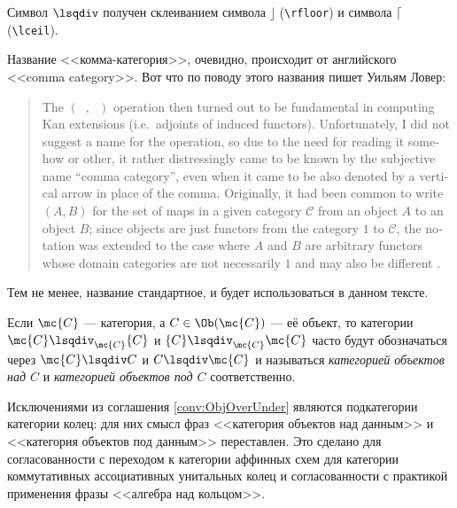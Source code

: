 \documentclass[
	extrafontsizes,
	11pt,
	hyphens,
]{memoir}
\begin{document}
\begin{remark}
Символ \(\lsqdiv\) получен склеиванием символа \(\rfloor\) (\texttt{\textbackslash{}rfloor}) и символа \(\lceil\) (\texttt{\textbackslash{}lceil}).
\end{remark}

\begin{remark}
Название <<комма-категория>>, очевидно, происходит от английского <<\textenglish{comma category}>>.
Вот что по поводу этого названия пишет Уильям Ловер:
\begin{quote}
\textenglish{%
The \((\phantom{x}, \phantom{x})\) operation then turned out to be fundamental in computing Kan extensions (i.e.\ adjoints of induced functors). Unfortunately, I did not suggest a name for the operation, so due to the need for reading it somehow or other, it rather distressingly came to be known by the subjective name ``comma category'', even when it came to be also denoted by a vertical arrow in place of the comma. Originally, it had been common to write \((A, B)\) for the set of maps in a given category \(\mathcal{C}\) from an object \(A\) to an object \(B\); since objects are just functors from the category \(1\) to \(\mathcal{C}\), the notation was extended to the case where \(A\) and \(B\) are arbitrary functors whose domain categories are not necessarily \(1\) and may also be different \autocite[13]{Lawvere_Thesis_Reprint}.}
\end{quote}
Тем не менее, название стандартное, и будет использоваться в данном тексте.
\end{remark}

\begin{convention}
\label{conv:ObjOverUnder}
Если \(\mc{C}\) --- категория, а \(C \in \Ob(\mc{C})\) --- её объект,
то категории \(\mc{C} \lsqdiv_{\mc{C}} \{C\}\) и \(\{C\} \lsqdiv_{\mc{C}} \mc{C}\) часто будут обозначаться через \(\mc{C} \lsqdiv C\) и \(C \lsqdiv \mc{C}\)
и называться \emph{категорией объектов над \(C\)} и \emph{категорией объектов под \(C\)} соответственно.
\end{convention}

\begin{convention}
Исключениями из соглашения \ref{conv:ObjOverUnder} являются подкатегории категории колец: для них смысл фраз <<категория объектов над данным>> и <<категория объектов под данным>> переставлен.
Это сделано для согласованности с переходом к категории аффинных схем для категории коммутативных ассоциативных унитальных колец и согласованности с практикой применения фразы <<алгебра над кольцом>>.
\end{convention}
\end{document}
